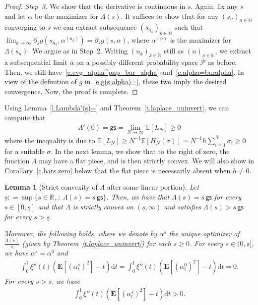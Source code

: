 \documentclass[11pt]{amsart}
\newtheorem{lemma}[proposition]{Lemma}
\theoremstyle{remark}
\theoremstyle{definition}
\numberwithin{equation}{section}
\numberwithin{proposition}{section}
\numberwithin{figure}{section}
\numberwithin{table}{section}
\newcommand{\N}{\mathbb{N}}
\newcommand{\R}{\mathbb{R}}
\newcommand{\E}{\mathbb{E}}
\newcommand{\EE}{\mathbf{E}}
\renewcommand{\geq}{\geqslant}
\renewcommand{\bar}{\overline}
\newcommand{\Ll}{\left}
\newcommand{\Rr}{\right}
\renewcommand{\d}{\mathrm{d}}
\newcommand{\1}{\mathbf{1}}
\newcommand{\msf}{\mathsf}
\newcommand{\msc}{\mathscr}
\newcommand{\pnp}{{(n)}}
\newcommand{\gs}{\msf {gs}}
\begin{document}
\begin{proof}
\medskip
\noindent\textit{Step~3.}
We show that the derivative is continuous in $s$. Again, fix any $s$ and let $\alpha$ be the maximizer for $\Lambda(s)$. It suffices to show that for any $(s_n)_{n\in\N}$ converging to $s$ we can extract subsequence $(s_{n_k})_{k\in\N}$ such that $\lim_{k\to\infty} \partial_s g(s_{n_k},\alpha^{(n_k)}) = \partial_s g(s,\alpha)$, where $\alpha^\pnp$ is the maximizer for $\Lambda(s_n)$. We argue as in Step~2. Writing $(n_k)_{k\in\N}$ still as $(n)_{n\in\N}$, we extract a subsequential limit $\bar\alpha$ on a possibly different probability space $\bar{\msc P}$ as before. Then, we still have~\eqref{e.cvg_alpha^pnp_bar_alpha} and~\eqref{e.alpha=baralpha}. In view of the definition of $g$ in~\eqref{e.g(s,alpha)=}, these two imply the desired convergence. Now, the proof is complete.
\end{proof}

Using Lemma~\ref{l.Lambda'(s)=} and Theorem~\ref{t.laplace_uninvert}, we can compute that
\begin{align}\label{e.Lambda'(0)=gs}
    \Lambda'(0)= \gs= \lim_{N\to\infty}\E [L_N] \geq 0
\end{align}
where the inequality is due to $\E [L_N]\geq N^{-1}\E[H_N(\sigma)]=N^{-1} h\sum_{i=1}^N\sigma_i\geq 0$ for a suitable $\sigma$.
In the next lemma, we show that to the right of zero, the function $\Lambda$ may have a flat piece, and is then strictly convex. We will also show in Corollary~\ref{c.bars.zero} below that the flat piece is necessarily absent when $h \neq 0$. 

\begin{lemma}[Strict convexity of $\Lambda$ after some linear portion]\label{l.cond_strict_convex}
Let $\underline s: = \sup\{s\in\R_+:\: \Lambda(s)=s \, \gs\}$. Then, we have that $\Lambda(s)=s \, \gs$ for every $s\in[0,\underline s]$ and that $\Lambda$ is strictly convex on $(\underline s ,\infty)$ and satisfies $\Lambda(s)> s \, \gs$ for every $s>\underline s$.

Moreover, the following holds, where we denote by $\alpha^s$ the unique optimizer of $\frac{\Lambda(s)}{s}$ (given by Theorem~\ref{t.laplace_uninvert}) for each $s\geq0$. For every $s\in(0,\underline s]$, we have $\alpha^s=\alpha^0$ and
\begin{align}\label{e.cond_strict_convex}
    \int_0^1\xi''(t) \Ll(\EE\Ll[\Ll(\alpha^s_t\Rr)^2\Rr]-t\Rr)\d t = \int_0^1\xi''(t) \Ll(\EE\Ll[\Ll(\alpha^0_t\Rr)^2\Rr]-t\Rr)\d t = 0.
\end{align}
For every $s>\underline s$, we have
\begin{align}\label{e.cond_strict_convex_2}
    \int_0^1\xi''(t) \Ll(\EE\Ll[\Ll(\alpha^s_t\Rr)^2\Rr]-t\Rr)\d t >0.
\end{align}
\end{lemma}
\end{document}
